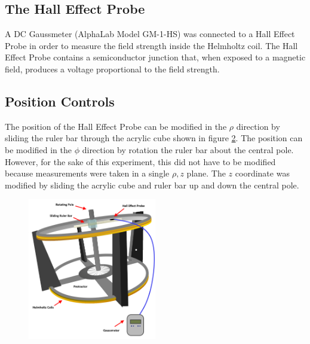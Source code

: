 \documentclass[a4paper]{article}
\begin{document}
\begin{figure}[h]
\centering
\label{helmholtz_circuit}
\end{figure}

\subsection{The Hall Effect Probe}

A DC Gaussmeter (AlphaLab Model GM-1-HS) was connected to a Hall Effect Probe in order to measure the field strength inside the Helmholtz coil. The Hall Effect Probe contains a semiconductor junction that, when exposed to a magnetic field, produces a voltage proportional to the field strength.

\subsection{Position Controls}

The position of the Hall Effect Probe can be modified in the $\rho$ direction by sliding the ruler bar through the acrylic cube shown in figure \ref{helmholtz_diagram}. The position can be modified in the $\phi$ direction by rotation the ruler bar about the central pole. However, for the sake of this experiment, this did not have to be modified because measurements were taken in a single $\rho , z$ plane. The $z$ coordinate was modified by sliding the acrylic cube and ruler bar up and down the central pole.

\begin{figure}[h]
\centering
\includegraphics[width=0.5\textwidth]{helmholtz_diagram.png}
\label{helmholtz_diagram}
\end{figure}
\end{document}
